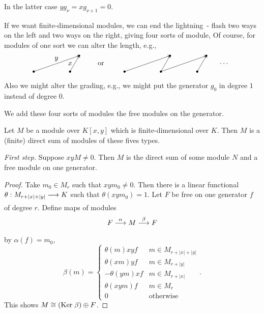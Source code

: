 \documentclass[../main]{subfiles}
\begin{document}
In the latter case $yg_\nu=xg_{\nu+1}=0$.

If we want finite-dimensional modules, we can end the lightning~-
flash two ways on the left and two ways on the right, giving four sorts of
module, Of course, for modules of one sort we can alter the length, 
e.g.,
\begin{equation*}
\begin{tikzpicture}[x=0.9cm,y=0.8cm]
  \foreach \a in {0,2,5,7,9} {\fill (\a,0) circle (1.5pt);}
  \foreach \a in {2.5,7.5,9.5} {\fill (\a,1) circle (1.5pt);}
  \draw[->] (0,0)--node[above] {$y$} (2.5,1);
  \draw[->] (2,0)--node[left] {$x$} (2.5,1);
  \node at (3.7,0.5) {$\text{or}$};
  \draw[->] (5,0)--(7.5,1); \draw[->] (7,0)--(7.5,1);
  \draw[->] (7,0)--(9.5,1); \draw[->] (9,0)--(9.5,1);
  \node at (10.5,0.5) {$\cdots$};
\end{tikzpicture}
\end{equation*}
Also we might alter the grading, e.g., we might put the generator $g_{0}$ in degree $1$ instead of degree $0$.

We add these four sorts of modules the free modules on the generator.
\begin{theorem}
\label{thm:p3ch16.11}
Let $M$ be a module over $K[x, y]$ which is finite-dimensional over $K$. Then $M$ is a (finite) direct sum of modules of these fives types. 
\end{theorem}

\emph{First step.} Suppose $xyM\ne0$. Then $M$ is the direct sum of some module $N$ and a free module on one generator.

\begin{proof}
Take $m_0 \in M_r$ such that $x y m_0 \ne 0$. Then there is a linear functional $\theta : M_{r + |x| + |y|} \lar{} K$ such that $\theta(x y m_0) = 1$. Let $F$ be free on one generator $f$ of degree $r$. Define maps of modules \[F \lar{\alpha} M \lar{\beta} F\] by $\alpha(f) = m_0$, \[\beta(m) = \begin{cases}\theta(m)xyf & m \in M_{r + |x| + |y|} \\ \theta(xm) y f & m \in M_{r + |y|} \\ -\theta(ym) x f & m \in M_{r + |x|} \\ \theta(xym)f & m  \in M_r \\ 0 & \text{otherwise}\end{cases}.\] This shows $M \cong (\mathrm{Ker}\hspace{0.1cm} \beta) \oplus F$. 
\end{proof}
\end{document}

